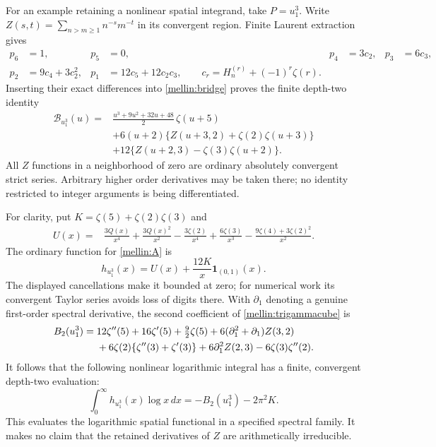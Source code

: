 For an example retaining a nonlinear spatial integrand, take $P=u_1^3$.
Write $Z(s,t)=\sum_{n>m\ge1}n^{-s}m^{-t}$ in its convergent region.
Finite Laurent extraction gives
\begin{align*}
 p_6&=1,&p_5&=0,&p_4&=3c_2,&p_3&=6c_3,\\
 p_2&=9c_4+3c_2^2,&p_1&=12c_5+12c_2c_3,
 \qquad c_r=H_n^{(r)}+(-1)^r\zeta(r).
\end{align*}
Inserting their exact differences into \eqref{mellin:bridge} proves
the finite depth-two identity
\begin{equation}\label{mellin:trigammacube}
 \boxed{\begin{aligned}
 \mathcal B_{u_1^3}(u)={}&
 \frac{u^3+9u^2+32u+48}{2}\,\zeta(u+5)\\
 &+6(u+2)\{Z(u+3,2)+\zeta(2)\zeta(u+3)\}\\
 &+12\{Z(u+2,3)-\zeta(3)\zeta(u+2)\}.
 \end{aligned}}
\end{equation}
All $Z$ functions in a neighborhood of zero are ordinary absolutely
convergent strict series.  Arbitrary higher order derivatives may be
taken there; no identity restricted to integer arguments is being
differentiated.

For clarity, put $K=\zeta(5)+\zeta(2)\zeta(3)$ and
\begin{align*}
 U(x)={}&\frac{3Q(x)}{x^4}+\frac{3Q(x)^2}{x^2}
 -\frac{3\zeta(2)}{x^4}+\frac{6\zeta(3)}{x^3}
 -\frac{9\zeta(4)+3\zeta(2)^2}{x^2}.
\end{align*}
The ordinary function for \eqref{mellin:A} is
\[
 h_{u_1^3}(x)=U(x)+\frac{12K}{x}\mathbf1_{(0,1)}(x).
\]
The displayed cancellations make it bounded at zero; for numerical
work its convergent Taylor series avoids loss of digits there.
With $\partial_1$ denoting a genuine first-order spectral derivative,
the second coefficient of \eqref{mellin:trigammacube} is
\begin{align}
 B_2(u_1^3)={}&12\zeta''(5)+16\zeta'(5)+\tfrac92\zeta(5)
 +6(\partial_1^2+\partial_1)Z(3,2)\notag\\
 &+6\zeta(2)\{\zeta''(3)+\zeta'(3)\}
 +6\partial_1^2 Z(2,3)-6\zeta(3)\zeta''(2).
 \label{mellin:cube-B2}
\end{align}
It follows that the following nonlinear logarithmic integral has a
finite, convergent depth-two evaluation:
\begin{equation}\label{mellin:cube-log}
 \boxed{\int_0^\infty h_{u_1^3}(x)\log x\,dx
                  =-B_2(u_1^3)-2\pi^2K.}
\end{equation}
This evaluates the logarithmic spatial functional in a specified
spectral family.  It makes no claim that the retained derivatives
of $Z$ are arithmetically irreducible.

